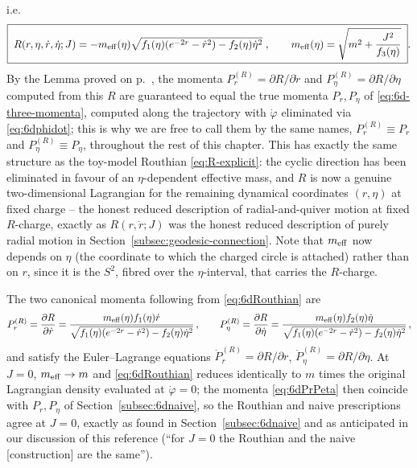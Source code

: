 \documentclass[11pt]{article}
\begin{document}
i.e.
\begin{equation}
\boxed{\;
R(r,\eta,\dot r,\dot\eta;J)
=
-m_{\rm eff}(\eta)\sqrt{f_1(\eta)(e^{-2r}-\dot r^2)-f_2(\eta)\dot\eta^2}\;,
\qquad
m_{\rm eff}(\eta)=\sqrt{m^2+\frac{J^2}{f_3(\eta)}}\;}.
\label{eq:6dRouthian}
\end{equation}
By the Lemma proved on p.~\pageref{lemma:routh}, the momenta $P_r^{(R)}=\partial R/\partial\dot r$ and $P_\eta^{(R)}=\partial R/\partial\eta$ computed from this $R$ are guaranteed to equal the true momenta $P_r,P_\eta$ of \eqref{eq:6d-three-momenta}, computed along the trajectory with $\dot\varphi$ eliminated via \eqref{eq:6dphidot}; this is why we are free to call them by the same names, $P_r^{(R)}\equiv P_r$ and $P_\eta^{(R)}\equiv P_\eta$, throughout the rest of this chapter.
This has exactly the same structure as the toy-model Routhian \eqref{eq:R-explicit}: the cyclic direction has been eliminated in favour of an $\eta$-dependent effective mass, and $R$ is now a genuine two-dimensional Lagrangian for the remaining dynamical coordinates $(r,\eta)$ at fixed charge -- the honest reduced description of radial-and-quiver motion at fixed $R$-charge, exactly as $R(r,\dot r;J)$ was the honest reduced description of purely radial motion in Section~\ref{subsec:geodesic-connection}. Note that $m_{\rm eff}$ now depends on $\eta$ (the coordinate to which the charged circle is attached) rather than on $r$, since it is the $S^2$, fibred over the $\eta$-interval, that carries the $R$-charge.

The two canonical momenta following from \eqref{eq:6dRouthian} are
\begin{equation}
P_r^{(R)}=\frac{\partial R}{\partial\dot r}=\frac{m_{\rm eff}(\eta)f_1(\eta)\dot r}{\sqrt{f_1(\eta)(e^{-2r}-\dot r^2)-f_2(\eta)\dot\eta^2}}\,,
\qquad
P_\eta^{(R)}=\frac{\partial R}{\partial\dot\eta}=\frac{m_{\rm eff}(\eta)f_2(\eta)\dot\eta}{\sqrt{f_1(\eta)(e^{-2r}-\dot r^2)-f_2(\eta)\dot\eta^2}}\,,
\label{eq:6dPrPeta}
\end{equation}
and satisfy the Euler--Lagrange equations $\dot P_r^{(R)}=\partial R/\partial r$, $\dot P_\eta^{(R)}=\partial R/\partial\eta$. At $J=0$, $m_{\rm eff}\to m$ and \eqref{eq:6dRouthian} reduces identically to $m$ times the original Lagrangian density evaluated at $\dot\varphi=0$; the momenta \eqref{eq:6dPrPeta} then coincide with $P_r,P_\eta$ of Section~\ref{subsec:6dnaive}, so the Routhian and naive prescriptions agree at $J=0$, exactly as found in Section~\ref{subsec:6dnaive} and as anticipated in our discussion of this reference (``for $J=0$ the Routhian and the naive [construction] are the same'').
\end{document}

